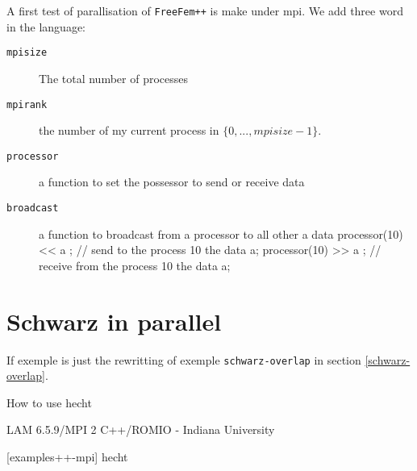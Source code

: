 \documentclass[twoside]{book}
\newif\ifpdf
\def\itemtt[#1]{ \item[\texttt{#1}]}
\begin{document}
\graphicspath{{./}{plots/}}
\ifpdf
\DeclareGraphicsExtensions{.pdf, .jpg, .tif}
\else
{}
\fi

\let\subsubsection\subsection
\let\subsection\section
\let\section\chapter

A first test of parallisation of \texttt{FreeFem++} is make under mpi.
We add three word in the language:
\begin{description}
\itemtt[mpisize] The total number of  processes
\itemtt[mpirank]  the number of my current process in $\{0,..., mpisize-1\}$.
\itemtt [processor] a function to set the possessor to send or receive data 
\itemtt [broadcast] a function to broadcast from a processor to all other a data 
\bFF
    processor(10) << a ; // send to the process 10 the data a;
    processor(10) >> a ; // receive from the process 10 the data a;

\eFF
\end{description}
\subsection{Schwarz in parallel}
If exemple is just the rewritting of exemple \texttt{schwarz-overlap} 
in section \ref{schwarz-overlap}.

How to use 
 hecht%

LAM 6.5.9/MPI 2 C++/ROMIO - Indiana University


[examples++-mpi] hecht%
\eFF
\end{document}
